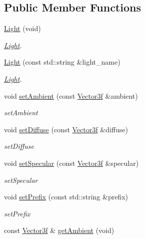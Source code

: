 \subsection*{Public Member Functions}
\begin{DoxyCompactItemize}
\item 
\hyperlink{classEngine_1_1Light_a7ac5fa5177a3abf2114a4e513e1c3bc4}{Light} (void)
\begin{DoxyCompactList}\small\item\em \hyperlink{classEngine_1_1Light}{Light}. \end{DoxyCompactList}\item 
\hyperlink{classEngine_1_1Light_ae0cdf2a9d051a17d1ef0a8f4377be2d4}{Light} (const std\+::string \&light\+\_\+name)
\begin{DoxyCompactList}\small\item\em \hyperlink{classEngine_1_1Light}{Light}. \end{DoxyCompactList}\item 
void \hyperlink{classEngine_1_1Light_ae9fa0c29a7e422f6ac9227916c9392fb}{set\+Ambient} (const \hyperlink{classVector3}{Vector3f} \&ambient)
\begin{DoxyCompactList}\small\item\em set\+Ambient \end{DoxyCompactList}\item 
void \hyperlink{classEngine_1_1Light_a640cc033be739f52fd7675e76ee32208}{set\+Diffuse} (const \hyperlink{classVector3}{Vector3f} \&diffuse)
\begin{DoxyCompactList}\small\item\em set\+Diffuse \end{DoxyCompactList}\item 
void \hyperlink{classEngine_1_1Light_a95d38c9dae170c43334f2706391eab26}{set\+Specular} (const \hyperlink{classVector3}{Vector3f} \&specular)
\begin{DoxyCompactList}\small\item\em set\+Specular \end{DoxyCompactList}\item 
void \hyperlink{classEngine_1_1Light_ad0467c8eb3d393597fab68f4842100ec}{set\+Prefix} (const std\+::string \&prefix)
\begin{DoxyCompactList}\small\item\em set\+Prefix \end{DoxyCompactList}\item 
const \hyperlink{classVector3}{Vector3f} \& \hyperlink{classEngine_1_1Light_aa2ac9bcc2a394867c487a37f911ae1cb}{get\+Ambient} (void)

\end{DoxyCompactItemize}
